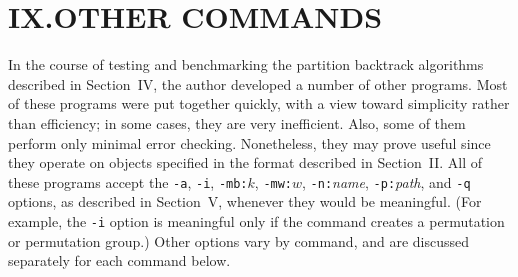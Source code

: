 \section{IX.\quad OTHER COMMANDS}
%
In the course of testing and benchmarking the partition backtrack
algorithms described in Section~IV, the author developed a number of other 
programs.  Most of these programs were put
together quickly, with a view toward simplicity rather than efficiency;
in some cases, they are very inefficient.  Also, some of them perform
only minimal error checking.  Nonetheless, they may prove useful since they 
operate on objects specified in the format described in Section~II.
\medbreak
All of these programs accept the {\tt -a}, {\tt -i}, {\tt -mb:$k$}, {\tt -mw:$w$},
{\tt -n:}{\it name}, {\tt -p:}{\it path}, and {\tt -q} options, as described
in Section~V, whenever they would be meaningful.  (For example, the {\tt -i}
option is meaningful only if the command creates a permutation or
permutation group.)  Other options vary by command, and are discussed separately
for each command below.
%

